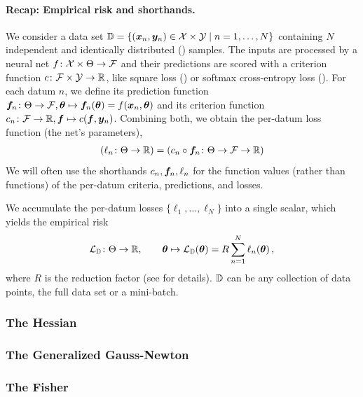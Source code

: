 \paragraph{Recap: Empirical risk and shorthands.}
We consider a data set ${\mathbb{D}} = \{({\bm{x}}_n, {\bm{y}}_n) \in {\mathcal{X}} \times {\mathcal{Y}} \mid n = 1, \dots, N \}$ containing $N$ independent and identically distributed (\iid) samples.
The inputs are processed by a neural net $f\colon {\mathcal{X}} \times \Theta \to {\mathcal{F}}$ and their predictions are scored with a criterion function $c\colon {\mathcal{F}} \times {\mathcal{Y}} \to {\mathbb{R}}$, like square loss () or softmax cross-entropy loss ().
For each datum $n$, we define its prediction function ${\bm{f}}_n\colon \Theta \to {\mathcal{F}}, {\bm{\theta}} \mapsto {\bm{f}}_n({\bm{\theta}}) = f({\bm{x}}_n, {\bm{\theta}})$ and its criterion function $c_n\colon {\mathcal{F}} \to {\mathbb{R}}, {\bm{f}} \mapsto c({\bm{f}}, {\bm{y}}_n)$.
Combining both, we obtain the per-datum loss function (\wrt the net's parameters),
\begin{align*}
  (\ell_n\colon \Theta \to {\mathbb{R}}) = (c_n \circ {\bm{f}}_n\colon \Theta \to {\mathcal{F}} \to {\mathbb{R}})
\end{align*}
We will often use the shorthands $c_n, {\bm{f}}_n, \ell_n$ for the function values (rather than functions) of the per-datum criteria, predictions, and losses.

We accumulate the per-datum losses $\{\ell_1, \dots, \ell_N\}$ into a single scalar, which yields the empirical risk
\begin{align*}
  {\mathcal{L}}_{{\mathbb{D}}}\colon \Theta \to {\mathbb{R}},
  \qquad
  {\bm{\theta}} \mapsto {\mathcal{L}}_{{\mathbb{D}}}({\bm{\theta}}) = R \sum_{n=1}^N \ell_n({\bm{\theta}})\,,
\end{align*}
where $R$ is the reduction factor (see  for details).
${\mathbb{D}}$ can be any collection of data points, \eg the full data set or a mini-batch.

\subsubsection{The Hessian}\label{sec:basics_dl_hessian}


\subsubsection{The Generalized Gauss-Newton}


\subsubsection{The Fisher}\label{sec:fisher}



